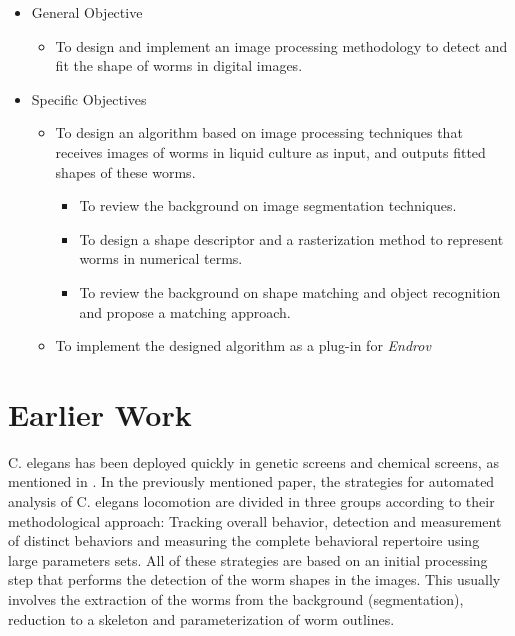 \begin{itemize}
\item General Objective
  \begin{itemize}
  \item To design and implement an image processing methodology to detect
    and fit the shape of worms in digital images.    
  \end{itemize}
\end{itemize}
\begin{itemize}
\item Specific Objectives
  \begin{itemize}
  \item To design an algorithm based on image processing techniques that
    receives images of worms in liquid culture as input, and outputs
    fitted shapes of these worms.
    \begin{itemize}
    \item To review the background on image segmentation techniques.    
    \item To design a shape descriptor and a rasterization method to
      represent worms in numerical terms.
    \item To review the background on shape matching and object recognition and
      propose a matching approach.    
    \end{itemize}
  \item To implement the designed algorithm as a plug-in for \emph{Endrov}
  \end{itemize}
\end{itemize}

\section{Earlier Work}

C. elegans has been deployed quickly in genetic screens and chemical
screens, as mentioned in \cite{automated}. In the previously mentioned paper,
the strategies for automated analysis of C. elegans locomotion are
divided in three groups according to their methodological approach:
Tracking overall behavior, detection and measurement of distinct behaviors and
measuring the complete behavioral repertoire using large parameters sets.
All of these strategies are based on an initial processing step that performs the detection of the worm shapes in the images. This usually involves the extraction of the worms from the background (segmentation), reduction to a skeleton and parameterization of worm outlines.

